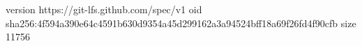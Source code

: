 version https://git-lfs.github.com/spec/v1
oid sha256:4f594a390e64c4591b630d9354a45d299162a3a94524bff18a69f26fd4f90cfb
size 11756
